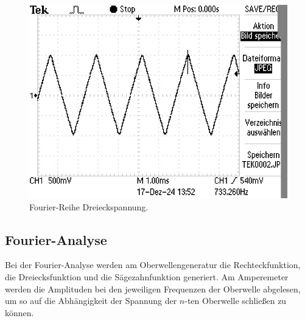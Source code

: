 \begin{figure}[H]
    \centering
    \caption{Fourier-Reihe Dreieckspannung.}
    \includegraphics{Bilder/TEK0002.JPG}
\end{figure}


\subsection{Fourier-Analyse}
Bei der Fourier-Analyse werden am Oberwellengeneratur die Rechteckfunktion,
die Dreiecksfunktion und die Sägezahnfunktion generiert. Am Amperemeter werden 
die Amplituden bei den jeweiligen Frequenzen der Oberwelle abgelesen, um so
auf die Abhängigkeit der Spannung der $n$-ten Oberwelle schließen zu können.
